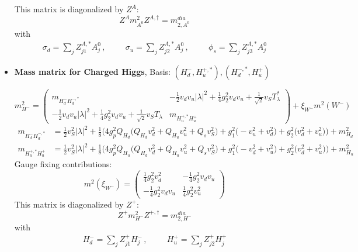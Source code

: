 \begin{itemize}
This matrix is diagonalized by \(Z^A\): 
\begin{equation} 
Z^A m^2_{A^0} Z^{A,\dagger} = m^{dia}_{2,A^0} 
\end{equation} 
with 
\begin{align} 
\sigma_{d} = \sum_{j}Z^{A,*}_{j 1}A^0_{{j}}\,, \hspace{1cm} 
\sigma_{u} = \sum_{j}Z^{A,*}_{j 2}A^0_{{j}}\,, \hspace{1cm} 
\phi_s = \sum_{j}Z^{A,*}_{j 3}A^0_{{j}}
\end{align} 
\item {\bf Mass matrix for Charged Higgs}, Basis: \( \left(H_d^-, H_u^{+,*}\right), \left(H_d^{-,*}, H_u^+\right) \) 
 
\begin{equation} 
m^2_{H^-} = \left( 
\begin{array}{cc}
m_{H_d^-H_d^{-,*}} &-\frac{1}{2} v_d v_u |\lambda|^2  + \frac{1}{4} g_{2}^{2} v_d v_u  + \frac{1}{\sqrt{2}} v_S T_{\lambda}^* \\ 
-\frac{1}{2} v_d v_u |\lambda|^2  + \frac{1}{4} g_{2}^{2} v_d v_u  + \frac{1}{\sqrt{2}} v_S T_{\lambda}  &m_{H_u^{+,*}H_u^+}\end{array} 
\right) +  \xi_{W^-}m^2(W^-) 
 \end{equation} 
\begin{align} 
m_{H_d^-H_d^{-,*}} &= \frac{1}{2} v_{S}^{2} |\lambda|^2  + \frac{1}{8} \Big(4 g_{p}^{2} Q_{H_d} \Big(Q_{H_d} v_{d}^{2}  + Q_{H_u} v_{u}^{2}  + Q_s v_{S}^{2} \Big) + g_{1}^{2} \Big(- v_{u}^{2}  + v_{d}^{2}\Big) + g_{2}^{2} \Big(v_{d}^{2} + v_{u}^{2}\Big)\Big) + m_{H_d}^2\\ 
m_{H_u^{+,*}H_u^+} &= \frac{1}{2} v_{S}^{2} |\lambda|^2  + \frac{1}{8} \Big(4 g_{p}^{2} Q_{H_u} \Big(Q_{H_d} v_{d}^{2}  + Q_{H_u} v_{u}^{2}  + Q_s v_{S}^{2} \Big) + g_{1}^{2} \Big(- v_{d}^{2}  + v_{u}^{2}\Big) + g_{2}^{2} \Big(v_{d}^{2} + v_{u}^{2}\Big)\Big) + m_{H_u}^2
\end{align} 
Gauge fixing contributions: 
\begin{equation} 
m^2 (\xi_{W^-}) = \left( 
\begin{array}{cc}
\frac{1}{4} g_{2}^{2} v_{d}^{2}  &-\frac{1}{4} g_{2}^{2} v_d v_u \\ 
-\frac{1}{4} g_{2}^{2} v_d v_u  &\frac{1}{4} g_{2}^{2} v_{u}^{2} \end{array} 
\right) 
 \end{equation} 
This matrix is diagonalized by \(Z^+\): 
\begin{equation} 
Z^+ m^2_{H^-} Z^{+,\dagger} = m^{dia}_{2,H^-} 
\end{equation} 
with 
\begin{align} 
H_d^- = \sum_{j}Z_{{j 1}}^{+}H^-_{{j}}\,, \hspace{1cm} 
H_u^+ = \sum_{j}Z_{{j 2}}^{+}H^+_{{j}}
\end{align} 
\end{itemize} 
